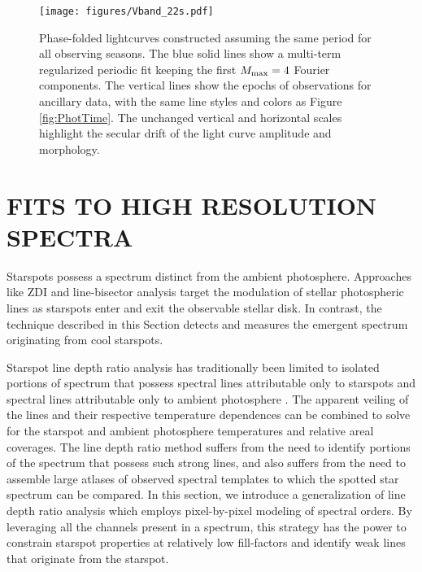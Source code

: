 \documentclass[12pt]{report}
\begin{document}
\begin{figure*}
 \centering
 \texttt{[image: figures/Vband\_22s.pdf]}
 \caption[Phase-folded lightcurves assuming the same 3.375 day period for all observing seasons.]{Phase-folded lightcurves constructed assuming the same period for all observing seasons.  The blue solid lines show a multi-term regularized periodic fit keeping the first $M_{\rm max}=4$ Fourier components.  The vertical lines show the epochs of observations for ancillary data, with the same line styles and colors as Figure \ref{fig:PhotTime}.  The unchanged vertical and horizontal scales highlight the secular drift of the light curve amplitude and morphology.}
 \label{fig:PhotPhase}
\end{figure*}





\section{FITS TO HIGH RESOLUTION SPECTRA}\label{sec:Starfish}

Starspots possess a spectrum distinct from the ambient photosphere.  Approaches like ZDI and line-bisector analysis \citep[\emph{e.g.}][]{prato08, donati14} target the modulation of stellar photospheric lines as starspots enter and exit the observable stellar disk.  In contrast, the technique described in this Section detects and measures the emergent spectrum originating from cool starspots.

Starspot line depth ratio analysis has traditionally been limited to isolated portions of spectrum that possess spectral lines attributable only to starspots and spectral lines attributable only to ambient photosphere \citep[\emph{e.g.}][]{neff95, oneal01}.  The apparent veiling of the lines and their respective temperature dependences can be combined to solve for the starspot and ambient photosphere temperatures and relative areal coverages.  The line depth ratio method suffers from the need to identify portions of the spectrum that possess such strong lines, and also suffers from the need to assemble large atlases of observed spectral templates to which the spotted star spectrum can be compared.  In this section, we introduce a generalization of line depth ratio analysis which employs pixel-by-pixel modeling of spectral orders.  By leveraging all the channels present in a spectrum, this strategy has the power to constrain starspot properties at relatively low fill-factors and identify weak lines that originate from the starspot.
\end{document}
